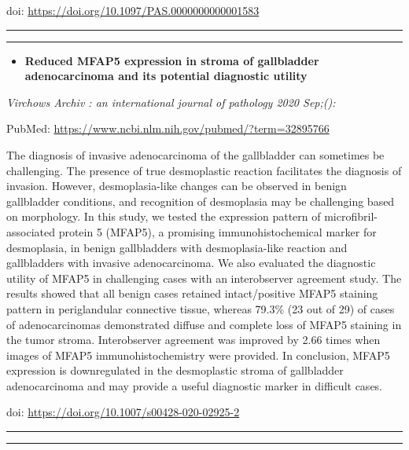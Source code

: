\documentclass[
]{article}
\providecommand{\tightlist}{%
  \setlength{\itemsep}{0pt}\setlength{\parskip}{0pt}}
\begin{document}
doi: \url{https://doi.org/10.1097/PAS.0000000000001583}

\begin{center}\rule{0.5\linewidth}{0.5pt}\end{center}

\begin{center}\rule{0.5\linewidth}{0.5pt}\end{center}

\begin{itemize}
\tightlist
\item
  \textbf{Reduced MFAP5 expression in stroma of gallbladder
  adenocarcinoma and its potential diagnostic utility}
\end{itemize}

\emph{Virchows Archiv : an international journal of pathology 2020
Sep;():}

PubMed: \url{https://www.ncbi.nlm.nih.gov/pubmed/?term=32895766}

The diagnosis of invasive adenocarcinoma of the gallbladder can
sometimes be challenging. The presence of true desmoplastic reaction
facilitates the diagnosis of invasion. However, desmoplasia-like changes
can be observed in benign gallbladder conditions, and recognition of
desmoplasia may be challenging based on morphology. In this study, we
tested the expression pattern of microfibril-associated protein 5
(MFAP5), a promising immunohistochemical marker for desmoplasia, in
benign gallbladders with desmoplasia-like reaction and gallbladders with
invasive adenocarcinoma. We also evaluated the diagnostic utility of
MFAP5 in challenging cases with an interobserver agreement study. The
results showed that all benign cases retained intact/positive MFAP5
staining pattern in periglandular connective tissue, whereas 79.3\% (23
out of 29) of cases of adenocarcinomas demonstrated diffuse and complete
loss of MFAP5 staining in the tumor stroma. Interobserver agreement was
improved by 2.66 times when images of MFAP5 immunohistochemistry were
provided. In conclusion, MFAP5 expression is downregulated in the
desmoplastic stroma of gallbladder adenocarcinoma and may provide a
useful diagnostic marker in difficult cases.

doi: \url{https://doi.org/10.1007/s00428-020-02925-2}

\begin{center}\rule{0.5\linewidth}{0.5pt}\end{center}

\begin{center}\rule{0.5\linewidth}{0.5pt}\end{center}
\end{document}
